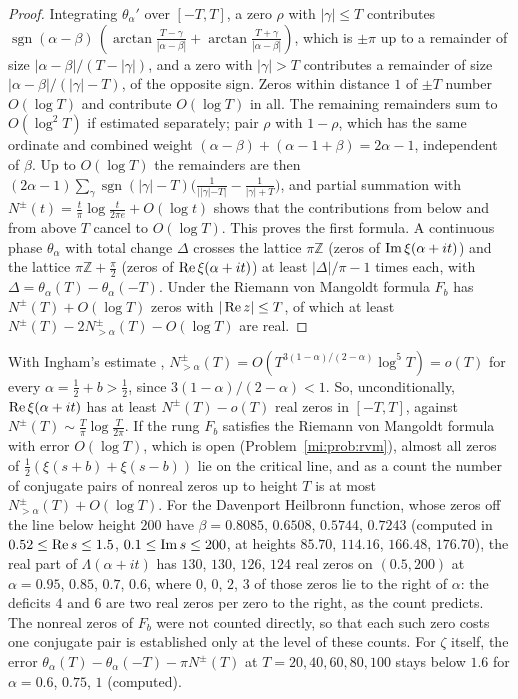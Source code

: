 \begin{proof}
Integrating $\theta_\alpha'$ over $[-T,T]$, a zero $\rho$ with $|\gamma|\le T$ contributes $\operatorname{sgn}(\alpha-\beta)\,(\arctan\frac{T-\gamma}{|\alpha-\beta|}+\arctan\frac{T+\gamma}{|\alpha-\beta|})$, which is $\pm\pi$ up to a remainder of size $|\alpha-\beta|/(T-|\gamma|)$, and a zero with $|\gamma|>T$ contributes a remainder of size $|\alpha-\beta|/(|\gamma|-T)$, of the opposite sign. Zeros within distance $1$ of $\pm T$ number $O(\log T)$ and contribute $O(\log T)$ in all. The remaining remainders sum to $O(\log^2T)$ if estimated separately; pair $\rho$ with $1-\rho$, which has the same ordinate and combined weight $(\alpha-\beta)+(\alpha-1+\beta)=2\alpha-1$, independent of $\beta$. Up to $O(\log T)$ the remainders are then $(2\alpha-1)\sum_\gamma\operatorname{sgn}(|\gamma|-T)\big(\frac1{||\gamma|-T|}-\frac1{|\gamma|+T}\big)$, and partial summation with $N^\pm(t)=\frac t\pi\log\frac t{2\pi e}+O(\log t)$ shows that the contributions from below and from above $T$ cancel to $O(\log T)$. This proves the first formula. A continuous phase $\theta_\alpha$ with total change $\Delta$ crosses the lattice $\pi\mathbb Z$ (zeros of $\operatorname{Im}\xi(\alpha+it)$) and the lattice $\pi\mathbb Z+\frac\pi2$ (zeros of $\operatorname{Re}\xi(\alpha+it)$) at least $|\Delta|/\pi-1$ times each, with $\Delta=\theta_\alpha(T)-\theta_\alpha(-T)$. Under the Riemann von Mangoldt formula $F_b$ has $N^\pm(T)+O(\log T)$ zeros with $|\operatorname{Re} z|\le T$, of which at least $N^\pm(T)-2N^\pm_{>\alpha}(T)-O(\log T)$ are real.
\end{proof}

With Ingham's estimate \cite{Ingham40}, $N^\pm_{>\alpha}(T)=O(T^{3(1-\alpha)/(2-\alpha)}\log^5T)=o(T)$ for every $\alpha=\frac12+b>\frac12$, since $3(1-\alpha)/(2-\alpha)<1$. So, unconditionally, $\operatorname{Re}\xi(\alpha+it)$ has at least $N^\pm(T)-o(T)$ real zeros in $[-T,T]$, against $N^\pm(T)\sim\frac T\pi\log\frac T{2\pi}$. If the rung $F_b$ satisfies the Riemann von Mangoldt formula with error $O(\log T)$, which is open (Problem~\ref{mi:prob:rvm}), almost all zeros of $\frac12(\xi(s+b)+\xi(s-b))$ lie on the critical line, and as a count the number of conjugate pairs of nonreal zeros up to height $T$ is at most $N^\pm_{>\alpha}(T)+O(\log T)$. For the Davenport Heilbronn function, whose zeros off the line below height $200$ have $\beta=0.8085$, $0.6508$, $0.5744$, $0.7243$ (computed in $0.52\le\operatorname{Re} s\le1.5$, $0.1\le\operatorname{Im} s\le200$, at heights $85.70$, $114.16$, $166.48$, $176.70$), the real part of $\Lambda(\alpha+it)$ has $130$, $130$, $126$, $124$ real zeros on $(0.5,200)$ at $\alpha=0.95$, $0.85$, $0.7$, $0.6$, where $0$, $0$, $2$, $3$ of those zeros lie to the right of $\alpha$: the deficits $4$ and $6$ are two real zeros per zero to the right, as the count predicts. The nonreal zeros of $F_b$ were not counted directly, so that each such zero costs one conjugate pair is established only at the level of these counts. For $\zeta$ itself, the error $\theta_\alpha(T)-\theta_\alpha(-T)-\pi N^\pm(T)$ at $T=20,40,60,80,100$ stays below $1.6$ for $\alpha=0.6$, $0.75$, $1$ (computed).

